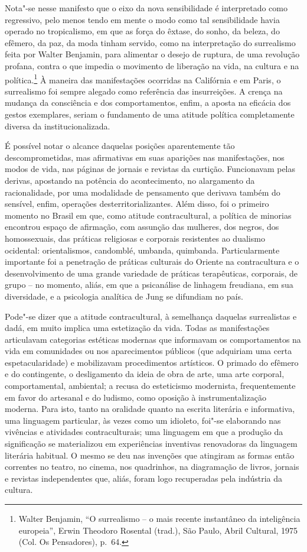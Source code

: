 Nota"-se nesse manifesto que o eixo da nova sensibilidade é interpretado
como regressivo, pelo menos tendo em mente o modo como tal
sensibilidade havia operado no tropicalismo, em que as força do êxtase,
do sonho, da beleza, do efêmero, da paz, da moda tinham servido, como na
interpretação do surrealismo feita por Walter Benjamin, para alimentar o
desejo de ruptura, de uma revolução profana, contra o que impedia o
movimento de liberação na vida, na cultura e na política.\footnote{Walter
  Benjamin, ``O surrealismo -- o mais recente instantâneo da
  inteligência europeia'', Erwin Theodoro Rosental (trad.), São Paulo,
  Abril Cultural, 1975 (Col. Os Pensadores), p.~64.} À maneira das
manifestações ocorridas na Califórnia e em Paris, o surrealismo foi
sempre alegado como referência das insurreições. A crença na mudança da
consciência e dos comportamentos, enfim, a aposta na eficácia dos gestos
exemplares, seriam o fundamento de uma atitude política completamente
diversa da institucionalizada.

É possível notar o alcance daquelas posições aparentemente tão
descomprometidas, mas afirmativas em suas aparições nas manifestações,
nos modos de vida, nas páginas de jornais e revistas da curtição.
Funcionavam pelas derivas, apostando na potência do acontecimento, no
alargamento da racionalidade, por uma modalidade de pensamento que
derivava também do sensível, enfim, operações desterritorializantes.
Além disso, foi o primeiro momento no Brasil em que, como atitude
contracultural, a política de minorias encontrou espaço de afirmação,
com assunção das mulheres, dos negros, dos homossexuais, das práticas
religiosas e corporais resistentes ao dualismo ocidental: orientalismos,
candomblé, umbanda, quimbanda. Particularmente importante foi a
penetração de práticas culturais do Oriente na contracultura e o
desenvolvimento de uma grande variedade de práticas terapêuticas,
corporais, de grupo -- no momento, aliás, em que a psicanálise de
linhagem freudiana, em sua diversidade, e a psicologia analítica de Jung
se difundiam no país.

Pode"-se dizer que a atitude contracultural, à semelhança daquelas
surrealistas e dadá, em muito implica uma estetização da vida. Todas as
manifestações articulavam categorias estéticas modernas que informavam
os comportamentos na vida em comunidades ou nos aparecimentos públicos
(que adquiriam uma certa espetacularidade) e mobilizavam procedimentos
artísticos. O primado do efêmero e do contingente, o desligamento da
ideia de obra de arte, uma arte corporal, comportamental, ambiental; a
recusa do esteticismo modernista, frequentemente em favor do artesanal e
do ludismo, como oposição à instrumentalização moderna. Para isto, tanto
na oralidade quanto na escrita literária e informativa, uma linguagem
particular, às vezes como um idioleto, foi"-se elaborando nas vivências e
atividades contraculturais; uma linguagem em que a produção da
significação se materializou em experiências inventivas renovadoras da
linguagem literária habitual. O mesmo se deu nas invenções que atingiram
as formas então correntes no teatro, no cinema, nos quadrinhos, na
diagramação de livros, jornais e revistas independentes que, aliás,
foram logo recuperadas pela indústria da cultura.

